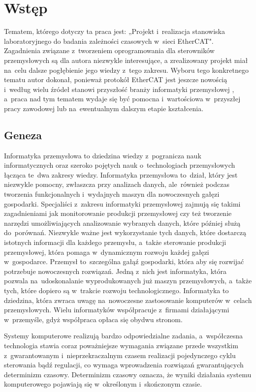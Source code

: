 \section{Wstęp}
Tematem, którego dotyczy ta praca jest: „Projekt i~realizacja stanowiska laboratoryjnego do badania zależności czasowych w~sieci EtherCAT". Zagadnienia związane z~tworzeniem oprogramowania dla sterowników przemysłowych są dla autora niezwykle interesujące, a zrealizowany projekt miał na~celu dalsze pogłębienie jego wiedzy z~tego zakresu. Wyboru tego konkretnego tematu autor dokonał, ponieważ protokół EtherCAT jest jeszcze nowością i~według wielu źródeł stanowi przyszłość branży informatyki przemysłowej \cite{art1_etherCAT, art2_etherCAT}, a~praca nad tym tematem wydaje się być pomocna i~wartościowa w~przyszłej pracy zawodowej lub na~ewentualnym dalszym etapie kształcenia.

\subsection{Geneza}
Informatyka przemysłowa to dziedzina wiedzy z~pogranicza nauk informatycznych oraz szeroko pojętych nauk o~technologiach przemysłowych łącząca te~dwa zakresy wiedzy. Informatyka przemysłowa to~dział, który jest niezwykle pomocny, zwłaszcza przy analizach danych, ale~również podczas tworzenia funkcjonalnych i~wydajnych maszyn dla nowoczesnych gałęzi gospodarki. Specjaliści z~zakresu informatyki przemysłowej zajmują się takimi zagadnieniami jak monitorowanie produkcji przemysłowej czy też tworzenie narzędzi umożliwiających analizowanie wybranych danych, które później służą do~porównań. Niezwykle ważne jest wykorzystanie tych danych, które dostarczą istotnych informacji dla każdego przemysłu, a~także sterowanie produkcji przemysłowej, która pomaga w~dynamicznym rozwoju każdej gałęzi w~gospodarce. 
Przemysł to~szczególna gałąź gospodarki, która aby się rozwijać potrzebuje nowoczesnych rozwiązań. Jedną z~nich jest informatyka, która pozwala na~udoskonalanie wyprodukowanych już maszyn przemysłowych, a~także tych, które dopiero są w~trakcie rozwoju technologicznego. Informatyka to dziedzina, która zwraca uwagę na~nowoczesne zastosowanie komputerów w~celach przemysłowych. Wielu informatyków współpracuje z~firmami działającymi w~przemyśle, gdyż współpraca opłaca się obydwu stronom.

Systemy komputerowe realizują bardzo odpowiedzialne zadania, a~współczesna technologia stawia coraz poważniejsze wymagania związane przede wszystkim z~gwarantowanym i~nieprzekraczalnym czasem realizacji pojedynczego cyklu sterowania bądź regulacji, co wymaga wprowadzenia rozwiązań gwarantujących determinizm czasowy. Determinizm czasowy oznacza, że wyniki działania systemu komputerowego pojawiają się w~określonym i~skończonym czasie.

